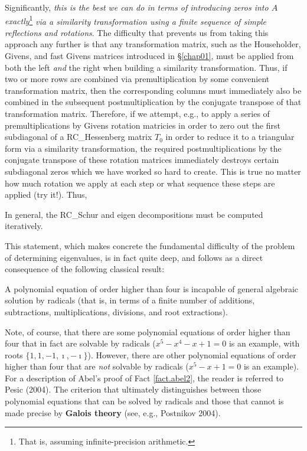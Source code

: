 Significantly, {\it this is the best we can do in terms of introducing zeros into $A$ exactly}\footnote{That is, assuming infinite-precision
arithmetic.} {\it via a similarity transformation using a finite sequence of simple reflections and rotations}.  The difficulty that prevents
us from taking this approach any further is that any transformation matrix, such as the Householder, Givens, and fast Givens matrices introduced in
\S \ref{chap01}, must be applied from both the left {\it and} the right when building a similarity transformation.  Thus, if two or more rows are combined
via premultiplication by some convenient transformation matrix, then the corresponding columns must immediately also be combined in the subsequent
postmultiplication by the 
conjugate transpose of that transformation matrix.  Therefore, if we attempt, e.g., to apply a series of premultiplications by Givens rotation matricies in
order to zero out the first subdiagonal of a RC_Hessenberg matrix $T_0$ in order to reduce it to a triangular form via a similarity transformation, the required
postmultiplications by the conjugate transpose of these rotation matrices immediately destroys certain subdiagonal zeros which we have worked so hard
to create.  This is true no matter how much rotation we apply at each step or what sequence these steps are applied (try it!).  Thus,

\begin{fact} \label{fact.abel1}
In general, the RC_Schur and eigen decompositions must be computed iteratively.
\end{fact}

\noindent This statement, which makes concrete the fundamental difficulty of the problem of determining eigenvalues,
is in fact quite deep, and follows as a direct consequence of the following classical result: 

\begin{fact} \label{fact.abel2} 
A polynomial equation of order higher than four is incapable of general algebraic solution by radicals
(that is, in terms of a finite number of additions, subtractions, multiplications, divisions, and root extractions). 
\end{fact}

\noindent Note, of course, that there are some polynomial equations of order higher than four that in fact are solvable
by radicals ($x^5-x^4-x+1=0$ is an example, with roots $\{1,1,-1,\imath,-\imath\}$).
However, there are other polynomial equations of order higher than four that are {\it not} solvable by radicals ($x^5-x+1=0$ is an example).
For a description of Abel's proof of Fact \ref{fact.abel2}, the reader is referred to Pesic (2004).
The criterion that ultimately distinguishes between those polynomial equations that can be solved by radicals and those that cannot is made precise
by {\bf Galois theory} (see, e.g., Postnikov 2004).

